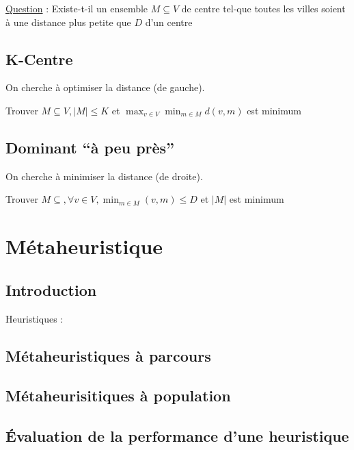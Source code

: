 \documentclass{article}
\theoremstyle{plain}
\begin{document}
    \underline{Question} : Existe-t-il un ensemble $M \subseteq V$ de centre
                           tel-que toutes les villes soient à une distance
                           plus petite que $D$ d'un centre

    \subsection{K-Centre}

      On cherche à optimiser la distance (de gauche).

      Trouver $M \subseteq V, |M| \leq K$ et
      $\max_{v\in V} \min_{m \in M} d(v, m)$ est minimum

    \subsection{Dominant ``à peu près''}

      On cherche à minimiser la distance (de droite).

      Trouver $M \subseteq, \forall v \in V, \min_{m \in M}(v, m) \leq D$
      et $|M|$ est minimum


  \section{Métaheuristique}

    \subsection{Introduction}

       Heuristiques : 

    \subsection{Métaheuristiques à parcours}

    \subsection{Métaheurisitiques à population}

    \subsection{\'Evaluation de la performance d'une heuristique}
\end{document}

